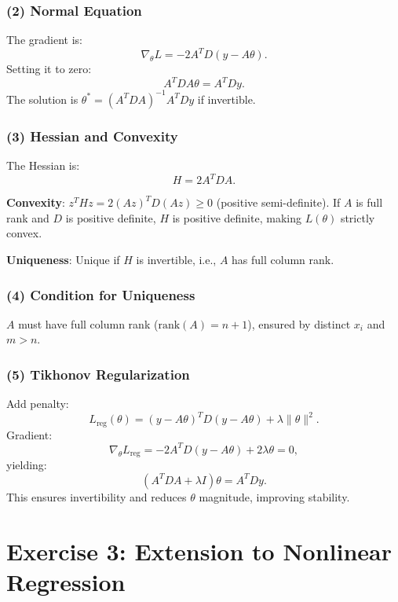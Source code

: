 \documentclass[a4paper,12pt]{article}
\begin{document}
\subsubsection*{(2) Normal Equation}
The gradient is:
\[
\nabla_\theta L = -2 A^T D (y - A \theta).
\]
Setting it to zero:
\[
A^T D A \theta = A^T D y.
\]
The solution is \( \theta^* = (A^T D A)^{-1} A^T D y \) if invertible.


\subsubsection*{(3) Hessian and Convexity}
The Hessian is:
\[
H = 2 A^T D A.
\]

\textbf{Convexity}: \( z^T H z = 2 (A z)^T D (A z) \geq 0 \) (positive semi-definite). If \( A \) is full rank and \( D \) is positive definite, \( H \) is positive definite, making \( L(\theta) \) strictly convex.

\textbf{Uniqueness}: Unique if \( H \) is invertible, i.e., \( A \) has full column rank.

\subsubsection*{(4) Condition for Uniqueness}
\( A \) must have full column rank (\( \text{rank}(A) = n+1 \)), ensured by distinct \( x_i \) and \( m > n \).

\subsubsection*{(5) Tikhonov Regularization}
Add penalty:
\[
L_{\text{reg}}(\theta) = (y - A \theta)^T D (y - A \theta) + \lambda \| \theta \|^2.
\]
Gradient:
\[
\nabla_\theta L_{\text{reg}} = -2 A^T D (y - A \theta) + 2 \lambda \theta = 0,
\]
yielding:
\[
(A^T D A + \lambda I) \theta = A^T D y.
\]
This ensures invertibility and reduces \( \theta \) magnitude, improving stability.

\clearpage

\section*{Exercise 3: Extension to Nonlinear Regression}
\end{document}
